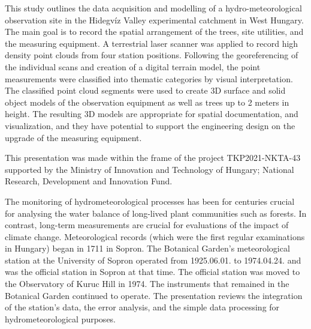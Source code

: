 This study outlines the data acquisition and modelling of a hydro-meteorological observation site in the Hidegvíz Valley experimental catchment in West Hungary. The main goal is to record the spatial arrangement of the trees, site utilities, and the measuring equipment. A terrestrial laser scanner was applied to record high density point clouds from four station positions. Following the georeferencing of the individual scans and creation of a digital terrain model, the point measurements were classified into thematic categories by visual interpretation. The classified point cloud segments were used to create 3D surface and solid object models of the observation equipment as well as trees up to 2 meters in height. The resulting 3D models are appropriate for spatial documentation, and visualization, and they have potential to support the engineering design on the upgrade of the measuring equipment.

This presentation was made within the frame of the project TKP2021-NKTA-43 supported by the Ministry of Innovation and Technology of Hungary; National Research, Development and Innovation Fund.
\newpage{}
{}
\begin{flushleft}






\end{flushleft}

\noindent

The monitoring of hydrometeorological processes has been for centuries crucial for analysing the water balance of long-lived plant communities such as forests. In contrast, long-term measurements are crucial for evaluations of the impact of climate change. Meteorological records (which were the first regular examinations in Hungary) began in 1711 in Sopron. The Botanical Garden’s meteorological station at the University of Sopron operated from 1925.06.01. to 1974.04.24. and was the official station in Sopron at that time. The official station was moved to the Observatory of Kuruc Hill in 1974. The instruments that remained in the Botanical Garden continued to operate. The presentation reviews the integration of the station's data, the error analysis, and the simple data processing for hydrometeorological purposes.

